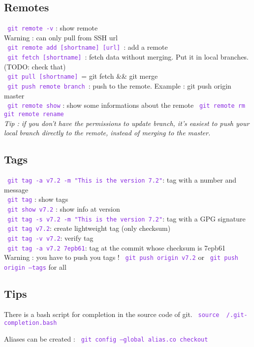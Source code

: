 \documentclass{article}
\def\cmd#1{\texttt{\textcolor{blueviolet}{#1}}}
\begin{document}
\subsection{Remotes}
\cmd{ git remote -v} : show remote \\
Warning : can only pull from SSH url\\
\cmd{ git remote add [shortname] [url]} : add a remote \\
\cmd{ git fetch [shortname]} : fetch data without merging. Put it in local
branches. (TODO: check that) \\
\cmd{ git pull [shortname]} = git fetch \&\& git merge\\
\cmd{ git push remote branch} : push to the remote. Example : git push origin
master\\
\cmd{ git remote show} : show some informations about the remote
\cmd{ git remote rm }\cmd{ git remote rename }\\
{\it Tip : if you don't have the permissions to update branch, it's easiest to push
your local branch directly to the remote, instead of merging to the master.}

\subsection{Tags}
\cmd{ git tag -a v7.2 -m "This is the version 7.2"}: tag with a number and
message \\
\cmd{ git tag} : show tags\\
\cmd{ git show v7.2} : show info at version\\
\cmd{ git tag -s v7.2 -m "This is the version 7.2"}: tag with a GPG signature\\
\cmd{ git tag v7.2}: create lightweight tag (only checksum)\\
\cmd{ git tag -v v7.2}: verify tag\\
\cmd{ git tag -a v7.2 7epb61}: tag at the commit whose checksum is 7epb61 \\
Warning : you have to push you tags ! \cmd{ git push origin v7.2} or 
\cmd{ git push origin --tags} for all

\subsection{Tips}
There is a bash script for completion in the source code of git.
\cmd{ source ~/.git-completion.bash}

Aliases can be created : \cmd{ git config --global alias.co checkout}
\end{document}
